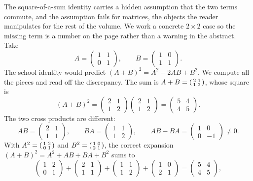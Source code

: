 The square-of-a-sum identity carries a hidden assumption that the two
terms commute, and the assumption fails for matrices, the objects the
reader manipulates for the rest of the volume. We work a concrete
$2\times 2$ case so the missing term is a number on the page rather than
a warning in the abstract. Take
\[
A = \begin{pmatrix} 1 & 1 \\ 0 & 1 \end{pmatrix},
\qquad
B = \begin{pmatrix} 1 & 0 \\ 1 & 1 \end{pmatrix}.
\]
The school identity would predict $(A+B)^{2} = A^{2} + 2AB + B^{2}$. We
compute all the pieces and read off the discrepancy. The sum is
$A + B = \begin{psmallmatrix} 2 & 1 \\ 1 & 2 \end{psmallmatrix}$, whose
square is
\[
(A+B)^{2}
= \begin{pmatrix} 2 & 1 \\ 1 & 2 \end{pmatrix}
  \begin{pmatrix} 2 & 1 \\ 1 & 2 \end{pmatrix}
= \begin{pmatrix} 5 & 4 \\ 4 & 5 \end{pmatrix}.
\]
The two cross products are different:
\[
AB = \begin{pmatrix} 2 & 1 \\ 1 & 1 \end{pmatrix},
\qquad
BA = \begin{pmatrix} 1 & 1 \\ 1 & 2 \end{pmatrix},
\qquad
AB - BA = \begin{pmatrix} 1 & 0 \\ 0 & -1 \end{pmatrix} \neq 0.
\]
With $A^{2} = \begin{psmallmatrix} 1 & 2 \\ 0 & 1 \end{psmallmatrix}$ and
$B^{2} = \begin{psmallmatrix} 1 & 0 \\ 2 & 1 \end{psmallmatrix}$, the
correct expansion $(A+B)^{2} = A^{2} + AB + BA + B^{2}$ sums to
\[
\begin{pmatrix} 1 & 2 \\ 0 & 1 \end{pmatrix}
+ \begin{pmatrix} 2 & 1 \\ 1 & 1 \end{pmatrix}
+ \begin{pmatrix} 1 & 1 \\ 1 & 2 \end{pmatrix}
+ \begin{pmatrix} 1 & 0 \\ 2 & 1 \end{pmatrix}
= \begin{pmatrix} 5 & 4 \\ 4 & 5 \end{pmatrix},
\]
